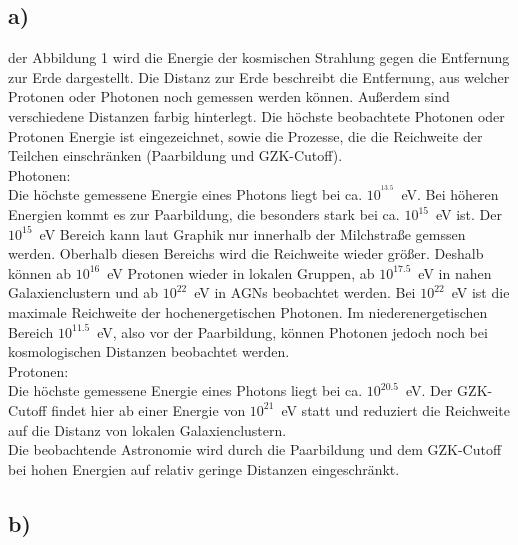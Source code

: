 \subsection{a)}

    \justifying der Abbildung 1 wird die Energie der kosmischen Strahlung gegen die Entfernung zur Erde dargestellt. Die Distanz zur Erde beschreibt die
    Entfernung, aus welcher Protonen oder Photonen noch gemessen werden können. Außerdem sind verschiedene Distanzen farbig hinterlegt. Die höchste beobachtete 
    Photonen oder Protonen Energie ist eingezeichnet, sowie die Prozesse, die die Reichweite der Teilchen einschränken (Paarbildung und GZK-Cutoff).\\
    Photonen:\\
    Die höchste gemessene Energie eines Photons liegt bei ca. $10^{^13.5}$\SI{}{\electronvolt}. Bei höheren Energien kommt es zur Paarbildung, die besonders stark bei ca. 
    $10^{15}$\SI{}{\electronvolt} ist. Der $10^{15}$\SI{}{\electronvolt} Bereich kann laut Graphik nur innerhalb der Milchstraße gemssen werden. Oberhalb diesen Bereichs
    wird die Reichweite wieder größer. Deshalb können ab $10^{16}$\SI{}{\electronvolt} Protonen wieder in lokalen Gruppen, ab $10^{17.5}$\SI{}{\electronvolt} in nahen
    Galaxienclustern und ab $10^{22}$\SI{}{\electronvolt} in AGNs beobachtet werden. Bei $10^{22}$\SI{}{\electronvolt} ist die maximale Reichweite der hochenergetischen 
    Photonen. Im niederenergetischen Bereich $10^{11.5}$\SI{}{\electronvolt}, also vor der Paarbildung, können Photonen jedoch noch bei kosmologischen Distanzen beobachtet 
    werden.\\
    Protonen:\\
    Die höchste gemessene Energie eines Photons liegt bei ca. $10^{20.5}$\SI{}{\electronvolt}. Der GZK-Cutoff findet hier ab einer Energie von $10^{21}$\SI{}{\electronvolt}
    statt und reduziert die Reichweite auf die Distanz von lokalen Galaxienclustern.\\
    Die beobachtende Astronomie wird durch die Paarbildung und dem GZK-Cutoff bei hohen Energien auf relativ geringe Distanzen eingeschränkt. 


\subsection{b)}

